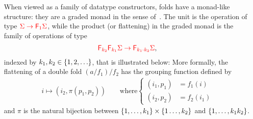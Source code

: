 When viewed as a family of datatype constructors,  folds have a monad-like structure: they are a graded  monad in the sense of~\cite[p. 518]{fujiShinyaMellies2016}. The unit is the operation 
of type ${\color{red}{\Sigma \to {\color{red}{\mathsf F_{1}}}\Sigma}}$, while  the product (or flattening) in the graded monad is the family of operations of type 
\begin{align*}
    {\color{red}{{\color{red}{\mathsf F_{k_2}}}{\color{red}{\mathsf F_{k_1}}}\Sigma \to {\color{red}{\mathsf F_{k_1 \cdot k_2}}}\Sigma}},
\end{align*}
indexed by $k_1,k_2 \in \{1,2,\ldots\}$, that is illustrated below:
More formally, the flattening of a double fold $(a/{f_1})/{f_2}$ has the grouping function defined by
\begin{align*}
i \mapsto (i_2, \pi(p_1,p_2)) \qquad \text{where} \begin{cases}
    (i_1,p_1) &= f_1(i)\\
    (i_2,p_2) &= f_2(i_1)
\end{cases}
\end{align*}
and $\pi$ is the natural bijection between $\{1,\ldots,k_1\} \times \{1\ldots,k_2\}$ and  $\{1,\ldots,k_1k_2\}$.


